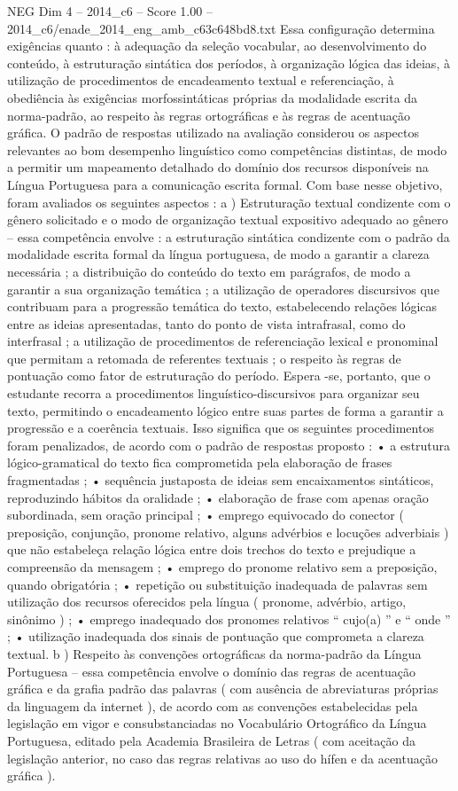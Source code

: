 \begin{textsample}{NEG Dim 4 – 2014\_c6 – Score 1.00 – 2014\_c6/enade\_2014\_eng\_amb\_c63c648bd8.txt}
Essa configuração determina exigências quanto : à adequação da seleção vocabular, ao desenvolvimento do conteúdo, à estruturação sintática dos períodos, à organização lógica das ideias, à utilização de procedimentos de encadeamento textual e referenciação, à obediência às exigências morfossintáticas próprias da modalidade escrita da norma-padrão, ao respeito às regras ortográficas e às regras de acentuação gráfica.
O padrão de respostas utilizado na avaliação considerou os aspectos relevantes ao bom desempenho linguístico como competências distintas, de modo a permitir um mapeamento detalhado do domínio dos recursos disponíveis na Língua Portuguesa para a comunicação escrita formal.
Com base nesse objetivo, foram avaliados os seguintes aspectos : a ) Estruturação textual condizente com o gênero solicitado e o modo de organização textual expositivo adequado ao gênero – essa competência envolve : a estruturação sintática condizente com o padrão da modalidade escrita formal da língua portuguesa, de modo a garantir a clareza necessária ; a distribuição do conteúdo do texto em parágrafos, de modo a garantir a sua organização temática ; a utilização de operadores discursivos que contribuam para a progressão temática do texto, estabelecendo relações lógicas entre as ideias apresentadas, tanto do ponto de vista intrafrasal, como do interfrasal ; a utilização de procedimentos de referenciação lexical e pronominal que permitam a retomada de referentes textuais ; o respeito às regras de pontuação como fator de estruturação do período.
Espera -se, portanto, que o estudante recorra a procedimentos linguístico-discursivos para organizar seu texto, permitindo o encadeamento lógico entre suas partes de forma a garantir a progressão e a coerência textuais.
Isso significa que os seguintes procedimentos foram penalizados, de acordo com o padrão de respostas proposto : • a estrutura lógico-gramatical do texto fica comprometida pela elaboração de frases fragmentadas ; • sequência justaposta de ideias sem encaixamentos sintáticos, reproduzindo hábitos da oralidade ; • elaboração de frase com apenas oração subordinada, sem oração principal ; • emprego equivocado do conector ( preposição, conjunção, pronome relativo, alguns advérbios e locuções adverbiais ) que não estabeleça relação lógica entre dois trechos do texto e prejudique a compreensão da mensagem ; • emprego do pronome relativo sem a preposição, quando obrigatória ; • repetição ou substituição inadequada de palavras sem utilização dos recursos oferecidos pela língua ( pronome, advérbio, artigo, sinônimo ) ; • emprego inadequado dos pronomes relativos “ cujo(a) ” e “ onde ” ; • utilização inadequada dos sinais de pontuação que comprometa a clareza textual. b ) Respeito às convenções ortográficas da norma-padrão da Língua Portuguesa – essa competência envolve o domínio das regras de acentuação gráfica e da grafia padrão das palavras ( com ausência de abreviaturas próprias da linguagem da internet ), de acordo com as convenções estabelecidas pela legislação em vigor e consubstanciadas no Vocabulário Ortográfico da Língua Portuguesa, editado pela Academia Brasileira de Letras ( com aceitação da legislação anterior, no caso das regras relativas ao uso do hífen e da acentuação gráfica ).

\end{textsample}
